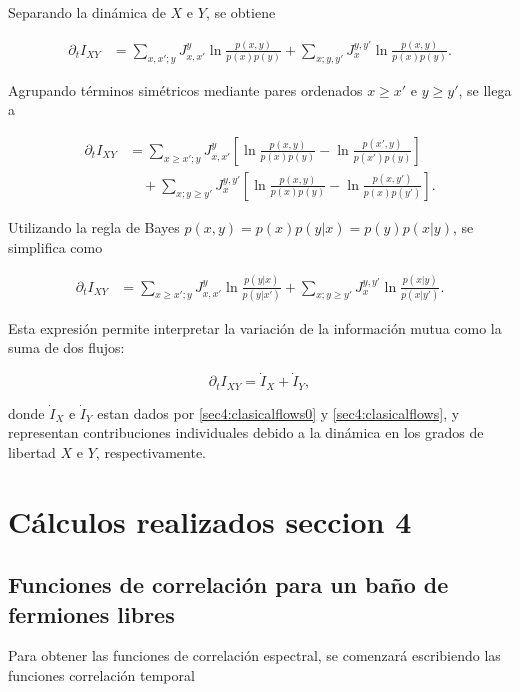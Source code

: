 \begin{appendixs}
Separando la dinámica de \(X\) e \(Y\), se obtiene

\begin{align*}
    \partial_{t} I_{XY} &= \sum_{x,x';y} J_{x,x'}^{y} \ln \frac{p(x,y)}{p(x)p(y)} 
    + \sum_{x;y,y'} J_{x}^{y,y'} \ln \frac{p(x,y)}{p(x)p(y)}.
\end{align*}

Agrupando términos simétricos mediante pares ordenados \(x \geq x'\) e \(y \geq y'\), se llega a

\begin{align*}
    \partial_{t} I_{XY} &= \sum_{x \geq x';y} J_{x,x'}^{y} \left[ \ln \frac{p(x,y)}{p(x)p(y)} - \ln \frac{p(x',y)}{p(x')p(y)} \right] \nonumber \\
    &\quad + \sum_{x;y \geq y'} J_{x}^{y,y'} \left[ \ln \frac{p(x,y)}{p(x)p(y)} - \ln \frac{p(x,y')}{p(x)p(y')} \right].
\end{align*}

Utilizando la regla de Bayes \(p(x,y) = p(x)p(y|x) = p(y)p(x|y)\), se simplifica como

\begin{align*}
    \partial_{t} I_{XY} 
    &= \sum_{x \geq x';y} J_{x,x'}^{y} \ln \frac{p(y|x)}{p(y|x')} 
     + \sum_{x;y \geq y'} J_{x}^{y,y'} \ln \frac{p(x|y)}{p(x|y')}.
\end{align*}

Esta expresión permite interpretar la variación de la información mutua como la suma de dos flujos:

\begin{equation*}
    \partial_{t} I_{XY} = \dot{I}_{X} + \dot{I}_{Y},
\end{equation*}

donde \(\dot{I}_{X}\) e \(\dot{I}_{Y}\) estan dados por \ref{sec4:clasicalflows0} y \ref{sec4:clasicalflows}, y representan contribuciones individuales debido a la dinámica en los grados de libertad \(X\) e \(Y\), respectivamente.


    \label{apendix4:secondlaw}


\newpage

\section{Cálculos realizados seccion 4}
\subsection{Funciones de correlación para un baño de fermiones libres}
Para obtener las funciones de correlación espectral, se comenzará escribiendo las funciones correlación temporal 


\end{appendixs}
